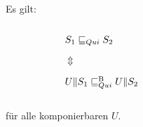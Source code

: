 \begin{frame}
  \begin{kor}
    Es gilt:
  \begin{columns}[]
    \begin{column}{.05\textwidth}
    \end{column}
    \begin{column}{.40\textwidth}
      \begin{block}{}
        \begin{center}
          $S_1\sqsubseteq _{Qui}{} S_2$

          \vspace{0.5em}
          $\Updownarrow$
          \vspace{0.5em}

          $U\|S_1\sqsubseteq _{Qui}^\mathrm{B}{} U\|S_2$
        \end{center}
      \end{block}
    \end{column}
    \begin{column}{.05\textwidth}
    \end{column}
    \begin{column}{.40\textwidth}
    \end{column}
    \begin{column}{.05\textwidth}
    \end{column}
  \end{columns}
  \vspace{1em}
  für alle komponierbaren $U$.
  \end{kor}
\end{frame}
